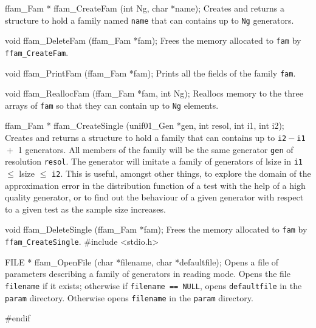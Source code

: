 ffam_Fam * ffam_CreateFam (int Ng, char *name);
\endcode
 \tab
  Creates and returns a structure to hold a family named
  {\tt name} that can contains up to {\tt Ng} generators.
 \endtab
\code


void ffam_DeleteFam (ffam_Fam *fam);
\endcode
 \tab
  Frees the memory allocated to {\tt fam} by {\tt ffam\_CreateFam}.
 \endtab
\code


void ffam_PrintFam (ffam_Fam *fam);
\endcode
 \tab
  Prints all the fields of the family {\tt fam}.
 \endtab
\code


void ffam_ReallocFam (ffam_Fam *fam, int Ng);
\endcode
 \tab
  Reallocs memory to the three arrays of {\tt fam} so that they can contain
  up to  {\tt Ng} elements.
 \endtab
\code


ffam_Fam * ffam_CreateSingle (unif01_Gen *gen, int resol, int i1, int i2);
\endcode
 \tab
  Creates and returns a structure to hold a family that can contains up
  to {\tt i2}${} - {}${\tt i1} ${} + {}$ 1 generators. All members of
  the family will be the same generator {\tt gen} of resolution {\tt resol}.
  The generator will imitate a family of generators of lsize in
  {\tt i1} $ \le $ lsize $\le$ {\tt i2}.
  This is useful, amongst other things, to explore the domain of
  the approximation error in the distribution function of a test with the
  help of a high quality generator, or to find out the behaviour of a
  given generator with respect to a given test as the
  sample size increases.
 \endtab
\code


void ffam_DeleteSingle (ffam_Fam *fam);
\endcode
 \tab
  Frees the memory allocated to {\tt fam} by {\tt ffam\_CreateSingle}.
 \endtab
\code
\hide
#include <stdio.h>

FILE * ffam_OpenFile (char *filename, char *defaultfile);
\endcode
 \tab
  Opens a file of parameters describing a family of generators in reading
  mode. Opens the file {\tt filename} if it exists; otherwise if
  {\tt filename == NULL}, opens {\tt defaultfile} in the {\tt param}
  directory.  Otherwise opens {\tt filename} in the  {\tt param}
  directory.
 \endtab
\code

#endif
\endhide
\endcode
